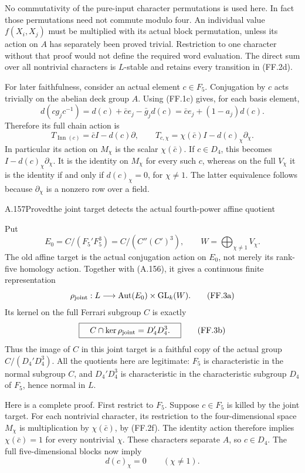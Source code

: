 No commutativity of the pure-input character permutations is
used here. In fact those permutations need not commute modulo
four. An individual value $f(X_i,X_j)$ must be multiplied with
its actual block permutation, unless its action on $A$ has
separately been proved trivial. Restriction to one character
without that proof would not define the required word
evaluation. The direct sum over all nontrivial characters is
$L$-stable and retains every transition in (FF.2d).

For later faithfulness, consider an actual element $c\in F_5$.
Conjugation by $c$ acts trivially on the abelian deck group $A$.
Using (FF.1c) gives, for each basis element,
\[
 d(cg_jc^{-1})
 =d(c)+\bar c e_j-\bar g_jd(c)
 =\bar c e_j+(1-a_j)d(c).
\]
Therefore its full chain action is
\[
 \boxed{\quad T_{\operatorname{Inn}(c)}
          =\bar c I-d(c)\partial,\qquad
 T_{c,\chi}=\chi(\bar c)I-d(c)_\chi\partial_\chi.\quad}
 \tag{FF.2f}
\]
In particular its action on $M_\chi$ is the scalar
$\chi(\bar c)$. If $c\in D_4$, this becomes
$I-d(c)_\chi\partial_\chi$. It is the identity on
$M_\chi$ for every such $c$, whereas on the full $V_\chi$
it is the identity if and only if $d(c)_\chi=0$, for
$\chi\ne1$. The latter equivalence follows because
$\partial_\chi$ is a nonzero row over a field.

\begin{statement}{A.157}{Proved}{the joint target detects the actual fourth-power affine quotient}
\end{statement}
Put
\[
 E_0=C/(F_5'F_5^3)=C/(C''(C')^3),\qquad
 W=\bigoplus_{\chi\ne1}V_\chi.
\]
The old affine target is the actual conjugation action on
$E_0$, not merely its rank-five homology action. Together
with (A.156), it gives a continuous finite representation
\[
 \rho_{\rm joint}:L\longrightarrow
       \operatorname{Aut}(E_0)\times\operatorname{GL}_k(W).
 \tag{FF.3a}
\]
Its kernel on the full Ferrari subgroup $C$ is exactly
\[
 \boxed{\quad C\cap\ker\rho_{\rm joint}=D_4'D_4^3.\quad}
 \tag{FF.3b}
\]
Thus the image of $C$ in this joint target is a faithful copy
of the actual group $C/(D_4'D_4^3)$.
All the quotients here are legitimate: $F_5$ is characteristic
in the normal subgroup $C$, and $D_4'D_4^3$ is characteristic
in the characteristic subgroup $D_4$ of $F_5$, hence normal
in $L$.

Here is a complete proof. First restrict to $F_5$. Suppose
$c\in F_5$ is killed by the
joint target. For each nontrivial character, its restriction
to the four-dimensional space $M_\chi$ is multiplication
by $\chi(\bar c)$, by (FF.2f). The identity action therefore
implies $\chi(\bar c)=1$ for every nontrivial $\chi$.
These characters separate $A$, so $c\in D_4$.
The full five-dimensional blocks now imply
\[
                         d(c)_\chi=0\qquad(\chi\ne1).
 \tag{FF.3c}
\]

